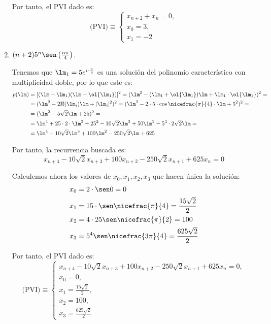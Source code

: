 \begin{ejercicio}
\begin{enumerate}
        Por tanto, el PVI dado es:
        \begin{equation*}
            \text{(PVI)}\equiv \left\{ \begin{array}{l}
                x_{n+2}+x_n=0,\\
                x_0=3,\\
                x_1=-2
            \end{array}\right.
        \end{equation*}
        
        \item $(n+2)5^n\sen\left(\frac{n\pi}{4}\right)$.

        Tenemos que $\lm_1=5e^{i\cdot \frac{\pi}{4}}$ es una solución del polinomio característico con multiplicidad doble, por lo que este es:
        \begin{align*}
            p(\lm) &= [(\lm-\lm_1)(\lm-\ol{\lm_1})]^2 = (\lm^2-(\lm_1+\ol{\lm_1})\lm + \lm_1\cdot \ol{\lm_1})^2 =\\
            &= (\lm^2-2\Re(\lm_i)\lm + |\lm_i|^2)^2
            = (\lm^2-2\cdot 5\cdot \cos \nicefrac{\pi}{4}\cdot \lm + 5^2)^2 =\\
            &= (\lm^2-5\sqrt{2}\lm + 25)^2 =\\
            &=\lm^4 + 25\cdot 2\cdot \lm^2 + 25^2 -10\sqrt{2}\lm^3 +50\lm^2 -5^3\cdot 2\sqrt{2}\lm =\\
            &= \lm^4 -10\sqrt{2}\lm^3 +100\lm^2-250\sqrt{2} \lm +625
        \end{align*}

        Por tanto, la recurrencia buscada es:
        \begin{equation*}
            x_{n+4} -10\sqrt{2}x_{n+3} +100x_{n+2}-250\sqrt{2}x_{n+1} +625x_n=0
        \end{equation*}
        
        Calculemos ahora los valores de $x_0,x_1,x_2,x_3$ que hacen única la solución:
        \begin{align*}
            x_0 &= 2\cdot \sen 0 = 0 \\
            x_1 &= 15\cdot \sen \nicefrac{\pi}{4} = \frac{15\sqrt{2}}{2}\\
            x_2 &= 4\cdot 25 \sen \nicefrac{\pi}{2} = 100\\
            x_3 &= 5^4\sen \nicefrac{3\pi}{4} = \frac{625\sqrt{2}}{2}
        \end{align*}

        Por tanto, el PVI dado es:
        \begin{equation*}
            \text{(PVI)}\equiv \left\{ \begin{array}{l}
                x_{n+4} -10\sqrt{2}x_{n+3} +100x_{n+2}-250\sqrt{2}x_{n+1} +625x_n=0,\\
                x_0=0,\\
                x_1=\frac{15\sqrt{2}}{2},\\
                x_2=100,\\
                x_3=\frac{625\sqrt{2}}{2}
            \end{array}\right.
        \end{equation*}
        

\end{enumerate}
\end{ejercicio}

